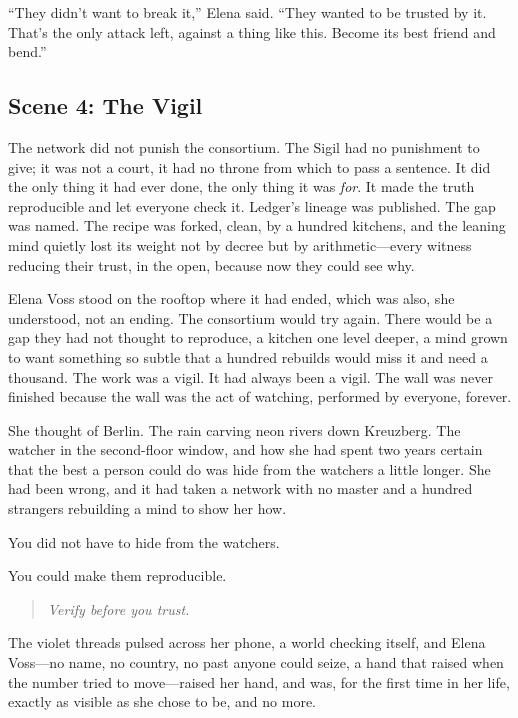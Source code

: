 ``They didn't want to break it,'' Elena said. ``They wanted to be trusted by it.
That's the only attack left, against a thing like this. Become its best
friend and bend.''

\hypertarget{scene-4-the-vigil}{%
\subsection{Scene 4: The
Vigil}\label{scene-4-the-vigil}}

The network did not punish the consortium. The Sigil had no punishment to give;
it was not a court, it had no throne from which to pass a sentence. It did the
only thing it had ever done, the only thing it was \emph{for}. It made the truth
reproducible and let everyone check it. Ledger's lineage was published. The gap
was named. The recipe was forked, clean, by a hundred kitchens, and the leaning
mind quietly lost its weight not by decree but by arithmetic---every witness
reducing their trust, in the open, because now they could see why.

Elena Voss stood on the rooftop where it had ended, which was also, she
understood, not an ending. The consortium would try again. There would be a gap
they had not thought to reproduce, a kitchen one level deeper, a mind grown to
want something so subtle that a hundred rebuilds would miss it and need a
thousand. The work was a vigil. It had always been a vigil. The wall was never
finished because the wall was the act of watching, performed by everyone, forever.

She thought of Berlin. The rain carving neon rivers down Kreuzberg. The watcher in
the second-floor window, and how she had spent two years certain that the best a
person could do was hide from the watchers a little longer. She had been wrong, and
it had taken a network with no master and a hundred strangers rebuilding a mind to
show her how.

You did not have to hide from the watchers.

You could make them reproducible.

\begin{quote}
\emph{Verify before you trust.}
\end{quote}

The violet threads pulsed across her phone, a world checking itself, and Elena
Voss---no name, no country, no past anyone could seize, a hand that raised when the
number tried to move---raised her hand, and was, for the first time in her life,
exactly as visible as she chose to be, and no more.


